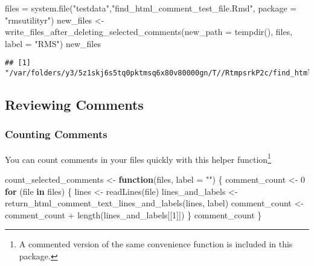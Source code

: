 \documentclass[
]{article}
\newenvironment{Shaded}{\begin{snugshade}}{\end{snugshade}}
\newcommand{\AttributeTok}[1]{\textcolor[rgb]{0.77,0.63,0.00}{#1}}
\newcommand{\ControlFlowTok}[1]{\textcolor[rgb]{0.13,0.29,0.53}{\textbf{#1}}}
\newcommand{\DecValTok}[1]{\textcolor[rgb]{0.00,0.00,0.81}{#1}}
\newcommand{\FunctionTok}[1]{\textcolor[rgb]{0.00,0.00,0.00}{#1}}
\newcommand{\NormalTok}[1]{#1}
\newcommand{\OtherTok}[1]{\textcolor[rgb]{0.56,0.35,0.01}{#1}}
\newcommand{\SpecialCharTok}[1]{\textcolor[rgb]{0.00,0.00,0.00}{#1}}
\newcommand{\StringTok}[1]{\textcolor[rgb]{0.31,0.60,0.02}{#1}}
\begin{document}
\begin{Shaded}
\begin{Highlighting}[]
\NormalTok{files }\OtherTok{=} \FunctionTok{system.file}\NormalTok{(}\StringTok{"testdata"}\NormalTok{,}\StringTok{"find\_html\_comment\_test\_file.Rmd"}\NormalTok{, }
                   \AttributeTok{package =} \StringTok{"rmsutilityr"}\NormalTok{)}
\NormalTok{new\_files }\OtherTok{\textless{}{-}} 
  \FunctionTok{write\_files\_after\_deleting\_selected\_comments}\NormalTok{(}\AttributeTok{new\_path =} \FunctionTok{tempdir}\NormalTok{(), }
\NormalTok{                                               files, }\AttributeTok{label =} \StringTok{"RMS"}\NormalTok{)}
\NormalTok{new\_files}
\end{Highlighting}
\end{Shaded}

\begin{verbatim}
## [1] "/var/folders/y3/5z1skj6s5tq0pktmsq6x80v80000gn/T//RtmpsrkP2c/find_html_comment_test_file.Rmd"
\end{verbatim}

\hypertarget{reviewing-comments}{%
\subsection{Reviewing Comments}\label{reviewing-comments}}

\hypertarget{counting-comments}{%
\subsubsection{Counting Comments}\label{counting-comments}}

You can count comments in your files quickly with this helper
function\footnote{ A commented version of the same convenience function
  is included in this package.}

\begin{Shaded}
\begin{Highlighting}[]
\NormalTok{count\_selected\_comments }\OtherTok{\textless{}{-}} \ControlFlowTok{function}\NormalTok{(files, }\AttributeTok{label =} \StringTok{""}\NormalTok{) \{}
\NormalTok{  comment\_count }\OtherTok{\textless{}{-}} \DecValTok{0}
  \ControlFlowTok{for}\NormalTok{ (file }\ControlFlowTok{in}\NormalTok{ files) \{}
\NormalTok{    lines }\OtherTok{\textless{}{-}} \FunctionTok{readLines}\NormalTok{(file)}
\NormalTok{    lines\_and\_labels }\OtherTok{\textless{}{-}} \FunctionTok{return\_html\_comment\_text\_lines\_and\_labels}\NormalTok{(lines, label)}
\NormalTok{    comment\_count }\OtherTok{\textless{}{-}}\NormalTok{ comment\_count }\SpecialCharTok{+} \FunctionTok{length}\NormalTok{(lines\_and\_labels[[}\DecValTok{1}\NormalTok{]])}
\NormalTok{  \}}
\NormalTok{  comment\_count}
\NormalTok{\}}
\end{Highlighting}
\end{Shaded}
\end{document}

